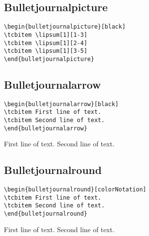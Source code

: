 \subsection{Bulletjournalpicture}

\lipsum[1][1-3]
\begin{highlightbox}
\begin{verbatim}
\begin{bulletjournalpicture}[black]
\tcbitem \lipsum[1][1-3]
\tcbitem \lipsum[1][2-4]
\tcbitem \lipsum[1][3-5]
\end{bulletjournalpicture}
\end{verbatim}
\end{highlightbox}
\begin{bulletjournalpicture}[black]
\tcbitem \lipsum[1][1-3]
\tcbitem \lipsum[1][2-4]
\tcbitem \lipsum[1][3-5]
\end{bulletjournalpicture}

\subsection{Bulletjournalarrow}

\lipsum[1][1-3]
\begin{highlightbox}
\begin{verbatim}
\begin{bulletjournalarrow}[black]
\tcbitem First line of text.
\tcbitem Second line of text.
\end{bulletjournalarrow}
\end{verbatim}
\end{highlightbox}
\begin{bulletjournalarrow}[black]
\tcbitem First line of text.
\tcbitem Second line of text.
\end{bulletjournalarrow}




\subsection{Bulletjournalround}
\begin{highlightbox}
\begin{verbatim}
\begin{bulletjournalround}[colorNotation]
\tcbitem First line of text.
\tcbitem Second line of text.
\end{bulletjournalround}
\end{verbatim}
\end{highlightbox}
\begin{bulletjournalround}[colorNotation]
\tcbitem First line of text.
\tcbitem Second line of text.
\end{bulletjournalround}


